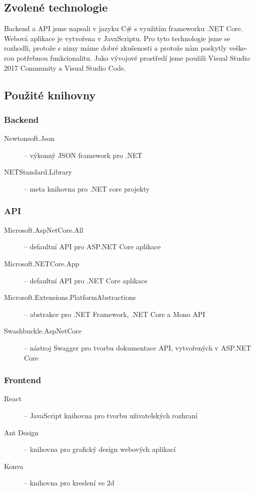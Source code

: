 \documentclass[a4paper,10pt]{article}
\begin{document}
\subsection{Zvolené technologie}
Backend a API jsme napsali v jazyku C\# s využitím frameworku .NET Core. Webová aplikace je vytvořena v JavaScriptu. Pro tyto technologie jsme se rozhodli, protože s nimy máme dobré zkušenosti a protože nám poskytly veške-rou potřebnou funkcionalitu. Jako vývojové prostředí jsme použili Visual Studio 2017 Community a Visual Studio Code.

\subsection{Použité knihovny}
\subsubsection*{Backend}
\begin{description}
	\item[Newtonsoft.Json] -- výkonný JSON framework pro .NET\cite{newtonsoft}
    \item[NETStandard.Library] -- meta knihovna pro .NET core projekty\cite{netstandard}
\end{description}

\subsubsection*{API}
\begin{description}
	\item[Microsoft.AspNetCore.All] -- defaultní API pro ASP.NET Core aplikace\cite{aspnetcore}
    \item[Microsoft.NETCore.App] -- defaultní API pro .NET Core aplikace\cite{netcore}
    \item[Microsoft.Extensions.PlatformAbstractions] -- abstrakce pro .NET Framework, .NET Core a Mono API\cite{abstractions}
    \item[Swashbuckle.AspNetCore] -- nástroj Swagger pro tvorbu dokumentace API, vytvořených v ASP.NET Core \cite{swagger}
\end{description}

\subsubsection*{Frontend}
\begin{description}
	\item[React] -- JavaScript knihovna pro tvorbu uživatelských rozhraní\cite{react}
    \item[Ant Design] -- knihovna pro grafický design webových aplikací\cite{ant}
    \item[Konva] -- knihovna pro kreslení ve 2d\cite{konva}
\end{description}
\end{document}
